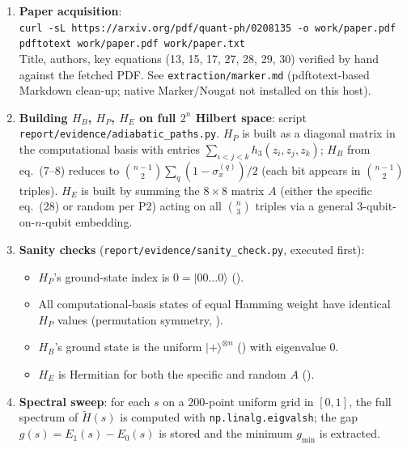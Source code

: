 \documentclass[11pt]{article}
\begin{document}
\begin{enumerate}
\item \textbf{Paper acquisition}: \\
      \texttt{curl -sL https://arxiv.org/pdf/quant-ph/0208135 -o work/paper.pdf} \\
      \texttt{pdftotext work/paper.pdf work/paper.txt} \\
      Title, authors, key equations (13, 15, 17, 27, 28, 29, 30) verified by hand
      against the fetched PDF. See \texttt{extraction/marker.md} (pdftotext-based
      Markdown clean-up; native Marker/Nougat not installed on this host).

\item \textbf{Building $H_B$, $H_P$, $H_E$ on full $2^n$ Hilbert space}: script
      \texttt{report/evidence/adiabatic\_paths.py}. $H_P$ is built as a diagonal
      matrix in the computational basis with entries $\sum_{i<j<k} h_3(z_i, z_j, z_k)$;
      $H_B$ from eq.\ (7--8) reduces to $\binom{n-1}{2} \sum_q (1 - \sigma_x^{(q)})/2$
      (each bit appears in $\binom{n-1}{2}$ triples). $H_E$ is built by summing the
      $8\times 8$ matrix $A$ (either the specific eq.\ (28) or random per P2) acting
      on all $\binom{n}{3}$ triples via a general 3-qubit-on-$n$-qubit embedding.

\item \textbf{Sanity checks} (\texttt{report/evidence/sanity\_check.py}, executed
      first):
      \begin{itemize}
          \item $H_P$'s ground-state index is $0 = |00\dots0\rangle$ (\checkmark).
          \item All computational-basis states of equal Hamming weight have identical
            $H_P$ values (permutation symmetry, \checkmark).
          \item $H_B$'s ground state is the uniform $|+\rangle^{\otimes n}$ (\checkmark)
            with eigenvalue $0$.
          \item $H_E$ is Hermitian for both the specific and random $A$ (\checkmark).
      \end{itemize}

\item \textbf{Spectral sweep}: for each $s$ on a $200$-point uniform grid in $[0,1]$,
      the full spectrum of $\tilde H(s)$ is computed with \texttt{np.linalg.eigvalsh};
      the gap $g(s) = E_1(s) - E_0(s)$ is stored and the minimum $g_{\min}$ is
      extracted.


\end{enumerate}
\end{document}
